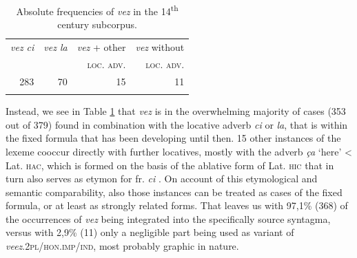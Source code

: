 \documentclass[output=paper,colorlinks,citecolor=brown]{langscibook}
\begin{document}
\begin{table}[ht]
	\centering
	\begin{tabularx}{0.6\textwidth}{rrr|r}
		\lsptoprule
			\emph{vez ci} & \emph{vez la} & \emph{vez} + other & \emph{vez} without \\
			& & \textsc{loc}. \textsc{adv}. & \textsc{loc}. \textsc{adv}. \\
			\midrule
			283 & 70 & 15 & 11 \\
		\lspbottomrule
	\end{tabularx}
	\caption{Absolute frequencies of \emph{vez} in the 14\textsuperscript{th} century subcorpus.}
	\label{07tab4}
\end{table}

Instead, we see in Table \ref{07tab4} that \emph{vez} is in the overwhelming majority of cases (353 out of 379) found in combination with the locative adverb \emph{ci} or \emph{la}, that is within the fixed formula that has been developing until then. 15 other instances of the lexeme cooccur directly with further locatives, mostly with the adverb \emph{ça} `here' \textless{} Lat. \textsc{hac}, which is formed on the basis of the ablative form of Lat. \textsc{hic} that in turn also serves as etymon for fr. \emph{ci} \citep[vol. 4, 373]{few1922}. On account of this etymological and semantic comparability, also those instances can be treated as cases of the fixed  formula, or at least as strongly related forms. That leaves us with 97,1\% (368) of the occurrences of \emph{vez} being integrated into the specifically  source syntagma, versus with 2,9\% (11) only a negligible part being used as variant of \emph{veez}.\textsc{2pl/hon.imp/ind}, most probably graphic in nature.
\end{document}
